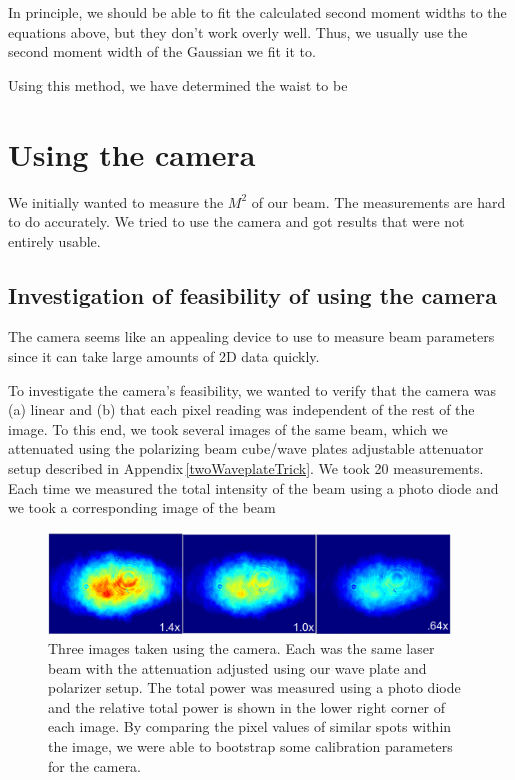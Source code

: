In principle, we should be able to fit the calculated second moment widths to the equations above, but they don't work overly well. Thus, we usually use the second moment width of the Gaussian we fit it to. 

Using this method, we have determined the waist to be 


\section{Using the camera}
We initially wanted to measure the $M^2$ of our beam. The measurements are hard to do accurately. We tried to use the camera and got results that were not entirely usable.

\subsection{Investigation of feasibility of using the camera}

The camera seems like an appealing device to use to measure beam parameters since it can take large amounts of 2D data quickly.


To investigate the camera's feasibility, we wanted to verify that the camera was (a) linear and (b) that each pixel reading was independent of the rest of the image. To this end, we took several images of the same beam, which we attenuated using the polarizing beam cube/wave plates adjustable attenuator setup described in Appendix\,\ref{twoWaveplateTrick}. We took 20 measurements. Each time we measured the total intensity of the beam using a photo diode and we took a corresponding image of the beam

\begin{figure}
\centerline{
\includegraphics[width=0.95\textwidth]{cameraimage}
}
\caption[Sample camera images]{Three images taken using the camera. Each was the same laser beam with the attenuation adjusted using our wave plate and polarizer setup. The total power was measured using a photo diode and the relative total power is shown in the lower right corner of each image. By comparing the pixel values of similar spots within the image, we were able to bootstrap some calibration parameters for the camera.}
\end{figure}

